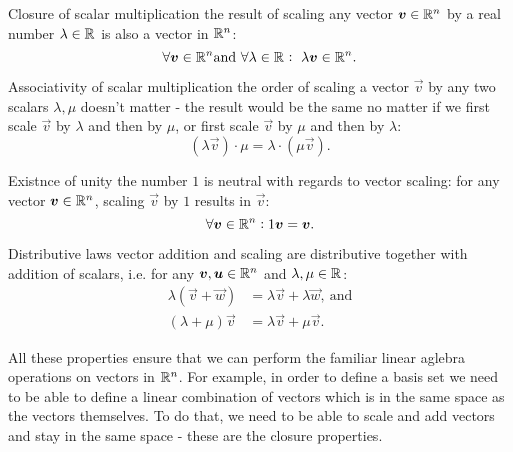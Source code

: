 \begin{descitemize}
\item[Closure of scalar multiplication] the result of scaling any vector $\vec{v}\in\Rs[n]$ by a real number $\lambda\in\Rs$ is also a vector in $\Rs[n]$:
    \begin{equation}
        \forall\vec{v}\in\Rs[n] \text{and}\ \forall\lambda\in\Rs:\ \lambda\vec{v}\in\Rs[n].
        \label{eq:scalar_multiplication_closure}
    \end{equation}

\item[Associativity of scalar multiplication] the order of scaling a vector $\vec{v}$ by any two scalars $\lambda,\mu$ doesn't matter - the result would be the same no matter if we first scale $\vec{v}$ by $\lambda$ and then by $\mu$, or first scale $\vec{v}$ by $\mu$ and then by $\lambda$:
    \begin{equation}
        \left(\lambda\vec{v}\right)\cdot\mu = \lambda\cdot\left(\mu\vec{v}\right).
        \label{eq:scalar_multiplication_associative}
    \end{equation}

    \item[Existnce of unity] the number $1$ is neutral with regards to vector scaling: for any vector $\vec{v}\in\Rs[n]$, scaling $\vec{v}$ by $1$ results in $\vec{v}$:
        \begin{equation}
            \forall \vec{v}\in\Rs[n]: 1\vec{v}=\vec{v}.
            \label{eq:scalar_multiplication_unity}
        \end{equation}

    \item[Distributive laws] vector addition and scaling are distributive together with addition of scalars, i.e. for any $\vec{v},\vec{u}\in\Rs[n]$ and $\lambda,\mu\in\Rs$:
        \begin{align}
            \lambda\left(\vec{v}+\vec{w}\right) &= \lambda\vec{v} + \lambda\vec{w},\ \text{and}\\ \left(\lambda+\mu\right)\vec{v} &= \lambda\vec{v} + \mu\vec{v}.
            \label{eq:label}
        \end{align}
\end{descitemize}

All these properties ensure that we can perform the familiar linear aglebra operations on vectors in $\Rs[n]$. For example, in order to define a basis set we need to be able to define a linear combination of vectors which is in the same space as the vectors themselves. To do that, we need to be able to scale and add vectors and stay in the same space - these are the closure properties.

